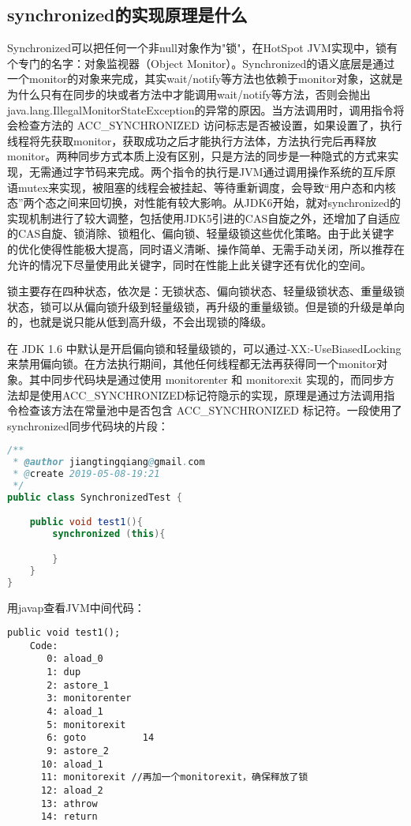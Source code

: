 \documentclass[../../../interview-questions.tex]{subfiles}
\begin{document}
\subsection{synchronized的实现原理是什么}

Synchronized可以把任何一个非null对象作为"锁"，在HotSpot JVM实现中，锁有个专门的名字：对象监视器（Object Monitor）。Synchronized的语义底层是通过一个monitor的对象来完成，其实wait/notify等方法也依赖于monitor对象，这就是为什么只有在同步的块或者方法中才能调用wait/notify等方法，否则会抛出java.lang.IllegalMonitorStateException的异常的原因。当方法调用时，调用指令将会检查方法的 ACC\_SYNCHRONIZED 访问标志是否被设置，如果设置了，执行线程将先获取monitor，获取成功之后才能执行方法体，方法执行完后再释放monitor。两种同步方式本质上没有区别，只是方法的同步是一种隐式的方式来实现，无需通过字节码来完成。两个指令的执行是JVM通过调用操作系统的互斥原语mutex来实现，被阻塞的线程会被挂起、等待重新调度，会导致“用户态和内核态”两个态之间来回切换，对性能有较大影响。从JDK6开始，就对synchronized的实现机制进行了较大调整，包括使用JDK5引进的CAS自旋之外，还增加了自适应的CAS自旋、锁消除、锁粗化、偏向锁、轻量级锁这些优化策略。由于此关键字的优化使得性能极大提高，同时语义清晰、操作简单、无需手动关闭，所以推荐在允许的情况下尽量使用此关键字，同时在性能上此关键字还有优化的空间。

锁主要存在四种状态，依次是：无锁状态、偏向锁状态、轻量级锁状态、重量级锁状态，锁可以从偏向锁升级到轻量级锁，再升级的重量级锁。但是锁的升级是单向的，也就是说只能从低到高升级，不会出现锁的降级。

在 JDK 1.6 中默认是开启偏向锁和轻量级锁的，可以通过-XX:-UseBiasedLocking来禁用偏向锁。在方法执行期间，其他任何线程都无法再获得同一个monitor对象。其中同步代码块是通过使用 monitorenter 和 monitorexit 实现的，而同步方法却是使用ACC\_SYNCHRONIZED标记符隐示的实现，原理是通过方法调用指令检查该方法在常量池中是否包含 ACC\_SYNCHRONIZED 标记符。一段使用了synchronized同步代码块的片段：

\begin{lstlisting}[language=Java]
/**
 * @author jiangtingqiang@gmail.com
 * @create 2019-05-08-19:21
 */
public class SynchronizedTest {

    public void test1(){
        synchronized (this){

        }
    }
}
\end{lstlisting}

用javap查看JVM中间代码：

\begin{lstlisting}
public void test1();
    Code:
       0: aload_0
       1: dup
       2: astore_1
       3: monitorenter
       4: aload_1
       5: monitorexit
       6: goto          14
       9: astore_2
      10: aload_1
      11: monitorexit //再加一个monitorexit，确保释放了锁
      12: aload_2
      13: athrow
      14: return
\end{lstlisting}
\end{document}
